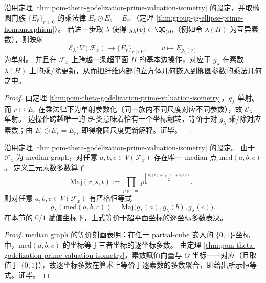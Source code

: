 \begin{corollary}\label{cor:pom-theta-godelization-ellipse-multiplicative-embedding}
沿用定理 \ref{thm:pom-theta-godelization-prime-valuation-isometry} 的设定，并取椭圆门族 \(\{E_r\}_{r>0}\) 的乘法律 \(E_r\odot E_s=E_{rs}\)（定理 \ref{thm:group-jg-ellipse-prime-homomorphism}）。
若进一步取 \(\lambda\) 使得 \(g_\lambda(v)\in\QQ_{>0}\)（例如令 \(\lambda(H)\) 为互异素数），则映射
\[
\mathcal E_\lambda:V(\mathcal F_x)\to\{E_r\}_{r>0},\qquad v\longmapsto E_{g_\lambda(v)}
\]
为单射。
并且在 \(\mathcal F_x\) 上跨越一条超平面 \(H\) 的基本边操作，对应于 \(g_\lambda\) 在素数 \(\lambda(H)\) 上的乘/除更新，从而把纤维内部的立方体几何嵌入到椭圆参数的乘法几何之中。
\end{corollary}
\begin{proof}
由定理 \ref{thm:pom-theta-godelization-prime-valuation-isometry}，\(g_\lambda\) 单射。
而 \(r\mapsto E_r\) 在乘法律下为单射参数化（同一族内不同尺度对应不同参数），故 \(\mathcal E_\lambda\) 单射。
边操作跨越唯一的 \(\Theta\)-类意味着恰有一个坐标翻转，等价于对 \(g_\lambda\) 乘/除对应素数；由 \(E_r\odot E_s=E_{rs}\) 即得椭圆尺度更新解释。证毕。
\end{proof}

\begin{theorem}\label{thm:pom-fiber-median-majority-prime-valuation}
沿用定理 \ref{thm:pom-theta-godelization-prime-valuation-isometry} 的设定。
由于 \(\mathcal F_x\) 为 median graph，对任意 \(a,b,c\in V(\mathcal F_x)\) 存在唯一 median 点 \(\mathrm{med}(a,b,c)\)。
定义三元素数多数算子
\[
\mathrm{Maj}(r,s,t)
:=\prod_{p\ \mathrm{prime}}
p^{\left\lfloor\frac{v_p(r)+v_p(s)+v_p(t)}{2}\right\rfloor}.
\]
则对任意 \(a,b,c\in V(\mathcal F_x)\) 有严格恒等式
\[
\boxed{\;
g_\lambda(\mathrm{med}(a,b,c))
=\mathrm{Maj}\bigl(g_\lambda(a),g_\lambda(b),g_\lambda(c)\bigr). \;}
\]
在本节的 \(0/1\) 赋值坐标下，上式等价于超平面坐标的逐坐标多数表决。
\end{theorem}
\begin{proof}
median graph 的等价刻画表明：在任一 partial-cube 嵌入的 \(\{0,1\}\)-坐标中，\(\mathrm{med}(a,b,c)\) 的坐标等于三者坐标的逐坐标多数。
由定理 \ref{thm:pom-theta-godelization-prime-valuation-isometry}，素数赋值向量与 \(\Theta\)-坐标一一对应（且取值于 \(\{0,1\}\)），故逐坐标多数在算术上等价于逐素数的多数聚合，即给出所示恒等式。证毕。
\end{proof}

